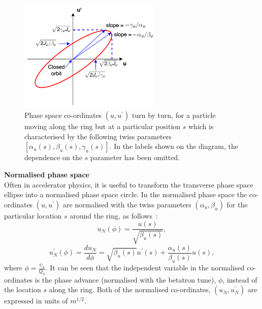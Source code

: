 \begin{figure}[!h] %
    \centering         
    \includegraphics[width=0.6\textwidth]{images/Ch2/phase_space_ellipse.png}
        \caption{Phase space co-ordinates $(u, u^\prime)$ turn by turn, for a particle moving along the ring but at a particular position $s$ which is characterised by the following twiss parameters $[\alpha_u(s), \beta_u(s), \gamma_u(s)]$. In the labels shown on the diagram, the dependence on the $s$ parameter has been omitted.}
        \label{fig:phase_space_ellipse}
 \end{figure}

 \textbf{Normalised phase space}\\  %
 Often in accelerator physics, it is useful to transform the transverse phase space ellipse into a normalised phase space circle. %
 In the normalised phase space the co-ordinates $(u, u^\prime)$ are normalised with the twiss parameters $(\alpha_u, \beta_u)$ for the particular location $s$ around the ring, as follows~\cite{Wiedemann:1083415}: %
 \begin{equation}\label{eq:normalised_coordinates_un}
     u_N(\phi) = \frac{u(s)}{\sqrt{\beta_u(s)}},
 \end{equation}
\begin{equation}\label{eq:normalised_coordinates_un_prime}
     u^\prime_N(\phi) = \frac{d u_N}{d \phi} = \sqrt{\beta_u(s)} u^\prime(s) + \frac{\alpha_u(s)}{\beta_u(s)}u(s),
 \end{equation}
where $\phi = \frac{\psi_u}{Q_u}$. It can be seen that the independent variable in the normalised co-ordinates is the phase advance (normalised with the betatron tune), $\phi$, instead of the location $s$ along the ring. %
Both of the normalised co-ordinates, $(u_N, u_N^\prime)$ are expressed in units of $m^{1/2}$.


